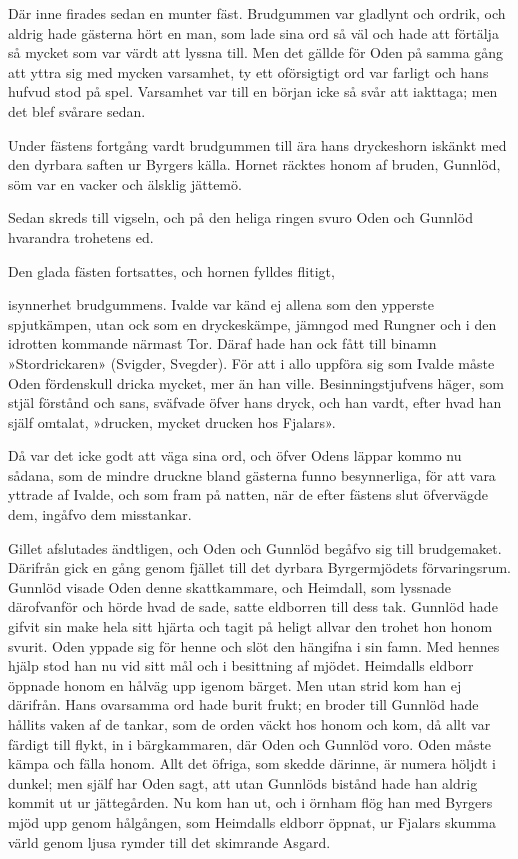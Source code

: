 Där inne firades sedan en munter fäst. Brudgummen var gladlynt och
ordrik, och aldrig hade gästerna hört en man, som lade sina ord så väl
och hade att förtälja så mycket som var värdt att lyssna till. Men det
gällde för Oden på samma gång att yttra sig med mycken varsamhet, ty ett
oförsigtigt ord var farligt och hans hufvud stod på spel. Varsamhet var
till en början icke så svår att iakttaga; men det blef svårare sedan.

Under fästens fortgång vardt brudgummen till ära hans dryckeshorn
iskänkt med den dyrbara saften ur Byrgers källa. Hornet räcktes honom af
bruden, Gunnlöd, söm var en vacker och älsklig jättemö.

Sedan skreds till vigseln, och på den heliga ringen svuro Oden och
Gunnlöd hvarandra trohetens ed.

Den glada fästen fortsattes, och hornen fylldes flitigt,

isynnerhet brudgummens. Ivalde var känd ej allena som den ypperste
spjutkämpen, utan ock som en dryckeskämpe, jämngod med Rungner och i den
idrotten kommande närmast Tor. Däraf hade han ock fått till binamn
»Stordrickaren» (Svigder, Svegder). För att i allo uppföra sig som
Ivalde måste Oden fördenskull dricka mycket, mer än han ville.
Besinningstjufvens häger, som stjäl förstånd och sans, sväfvade öfver
hans dryck, och han vardt, efter hvad han själf omtalat, »drucken,
mycket drucken hos Fjalars».

Då var det icke godt att väga sina ord, och öfver Odens läppar kommo nu
sådana, som de mindre druckne bland gästerna funno besynnerliga, för att
vara yttrade af Ivalde, och som fram på natten, när de efter fästens
slut öfvervägde dem, ingåfvo dem misstankar.

Gillet afslutades ändtligen, och Oden och Gunnlöd begåfvo sig till
brudgemaket. Därifrån gick en gång genom fjället till det dyrbara
Byrgermjödets förvaringsrum. Gunnlöd visade Oden denne skattkammare, och
Heimdall, som lyssnade därofvanför och hörde hvad de sade, satte
eldborren till dess tak. Gunnlöd hade gifvit sin make hela sitt hjärta
och tagit på heligt allvar den trohet hon honom svurit. Oden yppade sig
för henne och slöt den hängifna i sin famn. Med hennes hjälp stod han nu
vid sitt mål och i besittning af mjödet. Heimdalls eldborr öppnade honom
en hålväg upp igenom bärget. Men utan strid kom han ej därifrån. Hans
ovarsamma ord hade burit frukt; en broder till Gunnlöd hade hållits
vaken af de tankar, som de orden väckt hos honom och kom, då allt var
färdigt till flykt, in i bärgkammaren, där Oden och Gunnlöd voro. Oden
måste kämpa och fälla honom. Allt det öfriga, som skedde därinne, är
numera höljdt i dunkel; men själf har Oden sagt, att utan Gunnlöds
bistånd hade han aldrig kommit ut ur jättegården. Nu kom han ut, och i
örnham flög han med Byrgers mjöd upp genom hålgången, som Heimdalls
eldborr öppnat, ur Fjalars skumma värld genom ljusa rymder till det
skimrande Asgard.

